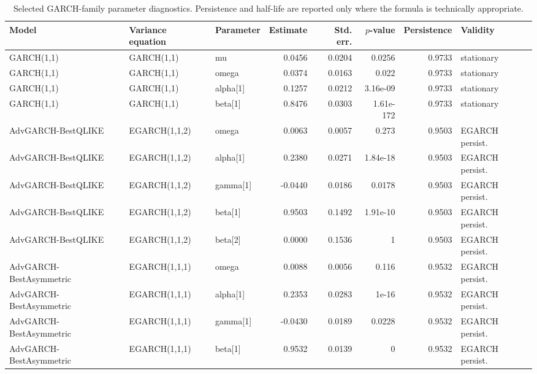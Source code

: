 \begin{table}[!t]
\centering
\caption{Selected GARCH-family parameter diagnostics. Persistence and half-life are reported only where the formula is technically appropriate.}
\label{tab:garch-parameter-diagnostics}
\scriptsize
\setlength{\tabcolsep}{4pt}
\begin{tabular}{@{}L{0.20\textwidth}L{0.16\textwidth}L{0.10\textwidth}rrrrL{0.13\textwidth}@{}}
\toprule
Model & Variance equation & Parameter & Estimate & Std. err. & \(p\)-value & Persistence & Validity \\
\midrule
GARCH(1,1) & GARCH(1,1) & mu & 0.0456 & 0.0204 & 0.0256 & 0.9733 & stationary \\
GARCH(1,1) & GARCH(1,1) & omega & 0.0374 & 0.0163 & 0.022 & 0.9733 & stationary \\
GARCH(1,1) & GARCH(1,1) & alpha[1] & 0.1257 & 0.0212 & 3.16e-09 & 0.9733 & stationary \\
GARCH(1,1) & GARCH(1,1) & beta[1] & 0.8476 & 0.0303 & 1.61e-172 & 0.9733 & stationary \\
AdvGARCH-BestQLIKE & EGARCH(1,1,2) & omega & 0.0063 & 0.0057 & 0.273 & 0.9503 & EGARCH persist. \\
AdvGARCH-BestQLIKE & EGARCH(1,1,2) & alpha[1] & 0.2380 & 0.0271 & 1.84e-18 & 0.9503 & EGARCH persist. \\
AdvGARCH-BestQLIKE & EGARCH(1,1,2) & gamma[1] & -0.0440 & 0.0186 & 0.0178 & 0.9503 & EGARCH persist. \\
AdvGARCH-BestQLIKE & EGARCH(1,1,2) & beta[1] & 0.9503 & 0.1492 & 1.91e-10 & 0.9503 & EGARCH persist. \\
AdvGARCH-BestQLIKE & EGARCH(1,1,2) & beta[2] & 0.0000 & 0.1536 & 1 & 0.9503 & EGARCH persist. \\
AdvGARCH-BestAsymmetric & EGARCH(1,1,1) & omega & 0.0088 & 0.0056 & 0.116 & 0.9532 & EGARCH persist. \\
AdvGARCH-BestAsymmetric & EGARCH(1,1,1) & alpha[1] & 0.2353 & 0.0283 & 1e-16 & 0.9532 & EGARCH persist. \\
AdvGARCH-BestAsymmetric & EGARCH(1,1,1) & gamma[1] & -0.0430 & 0.0189 & 0.0228 & 0.9532 & EGARCH persist. \\
AdvGARCH-BestAsymmetric & EGARCH(1,1,1) & beta[1] & 0.9532 & 0.0139 & 0 & 0.9532 & EGARCH persist. \\
\bottomrule
\end{tabular}
\end{table}
